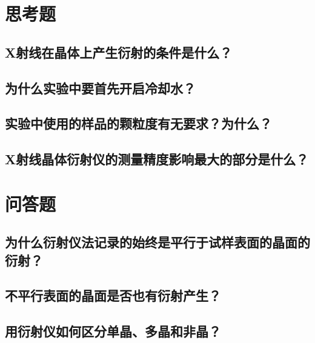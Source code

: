 \documentclass[a4paper]{article}
\begin{document}
\section{思考题}
%
\subsection*{X射线在晶体上产生衍射的条件是什么？}
\subsection*{为什么实验中要首先开启冷却水？}
\subsection*{实验中使用的样品的颗粒度有无要求？为什么？}
\subsection*{X射线晶体衍射仪的测量精度影响最大的部分是什么？}

\section{问答题}
\subsection*{为什么衍射仪法记录的始终是平行于试样表面的晶面的衍射？}
\subsection*{不平行表面的晶面是否也有衍射产生？}
\subsection*{用衍射仪如何区分单晶、多晶和非晶？}

\nocite{jiaocai}

\end{document}
